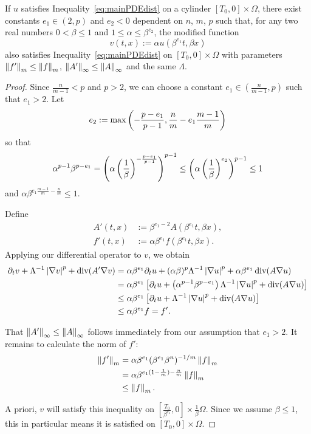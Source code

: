 \begin{lemma} \label{th:scaling2}
If $u$ satisfies Inequality~\eqref{eq:mainPDEdist} on a cylinder $[T_0,0]\times\Omega$, there exist constants $e_1 \in (2,p)$ and $e_2 < 0$ dependent on $n$, $m$, $p$ such that, for any two real numbers $0 < \beta \leq 1$ and $1\leq \alpha \leq \beta^{e_2}$,  %
the modified function 
\[ v(t,x) := \alpha u(\beta^{e_1} t, \beta x)\]
also satisfies Inequality~\eqref{eq:mainPDEdist} on $\left[ T_0,0\right] \times \Omega$ with parameters $\left\lVert f'\right\rVert_m \leq \left\lVert f\right\rVert_m$, $\left\lVert A'\right\rVert_\infty \leq \left\lVert A\right\rVert_\infty$ and the same $\Lambda$.  
\end{lemma}

\begin{proof}
Since $\frac{n}{m-1} < p$ and $p > 2$, we can choose a constant $e_1 \in (\frac{n}{m-1},p)$ such that $e_1 > 2$.  Let
\[ e_2 := \max\left( -\frac{p-e_1}{p-1}, \frac{n}{m} - e_1\frac{m-1}{m}  \right) \]
so that
\[ \alpha^{p-1} \beta^{p-e_1} = \left( \alpha \left( \frac{1}{\beta} \right)^{-\frac{p-e_1}{p-1}} \right)^{p-1} \leq \left( \alpha \left( \frac{1}{\beta} \right)^{e_2} \right)^{p-1} \leq 1\]
 and $\alpha \beta^{e_1\frac{m-1}{m}-\frac{n}{m}} \leq 1$.  

Define 
\begin{align*}
A'(t,x) &:= \beta^{e_1-2} A(\beta^{e_1} t, \beta x), \\
f'(t,x) &:= \alpha \beta^{e_1} f(\beta^{e_1} t, \beta x).
\end{align*}
Applying our differential operator to $v$, we obtain 
\begin{align*}
\partial_t v + \Lambda^{-1} \left\lvert \nabla v \right\rvert^p + \operatorname{div}(A' \nabla v) &= \alpha \beta^{e_1} \partial_t u + (\alpha\beta)^p \Lambda^{-1} \left\lvert \nabla u \right\rvert^p + \alpha \beta^{e_1} \operatorname{div}(A \nabla u)
\\ &= \alpha\beta^{e_1} \left[ \partial_t u + \left( \alpha^{p-1}\beta^{p-e_1} \right) \Lambda^{-1} \left\lvert \nabla u \right\rvert^p + \operatorname{div}(A \nabla u) \right]
\\ &\leq \alpha\beta^{e_1} \left[ \partial_t u + \Lambda^{-1} \left\lvert \nabla u \right\rvert^p + \operatorname{div}(A \nabla u) \right]
\\ &\leq \alpha\beta^{e_1} f = f'.
\end{align*}

That $\left\lVert A'\right\rVert_\infty \leq \left\lVert A\right\rVert_\infty$ follows immediately from our assumption that $e_1 > 2$.  It remains to calculate the norm of $f'$:
\begin{align*}
\left\lVert f'\right\rVert_m &= \alpha \beta^{e_1} (\beta^{e_1} \beta^n)^{-1/m} \left\lVert f\right\rVert_m 
\\ &= \alpha \beta^{e_1(1-\frac{1}{m}) - \frac{n}{m}} \left\lVert f\right\rVert_m
\\ &\leq \left\lVert f\right\rVert_m.
\end{align*}

A priori, $v$ will satisfy this inequality on $\left[ \frac{T_0}{\beta^{e_1}},0\right] \times \frac{1}{\beta} \Omega$.  Since we assume $\beta \leq 1$, this in particular means it is satisfied on $[T_0,0] \times \Omega$.  
  

\end{proof}

